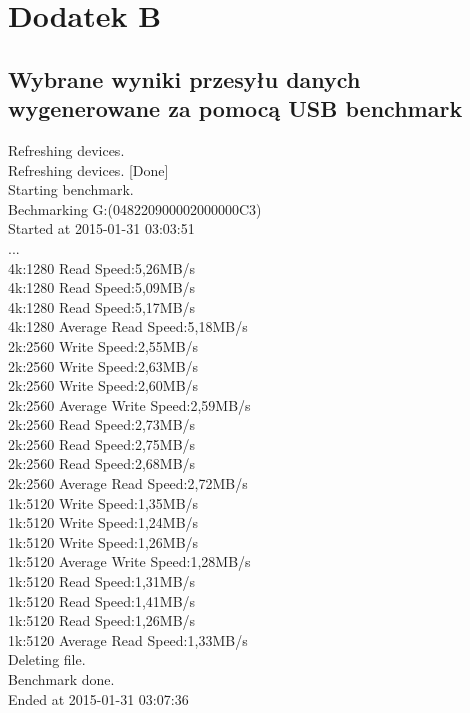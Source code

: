 \documentclass{BscUS}
\newcommand\blankpage{%
    \null
    \thispagestyle{empty}%
    \newpage}
\begin{document}
\newpage
\afterpage{\blankpage}



\chapter*{Dodatek B} \label{App:AppendixB}
\section*{Wybrane wyniki przesyłu danych wygenerowane za pomocą USB benchmark}
\noindent Refreshing devices. \\
Refreshing devices. [Done] \\ 
Starting benchmark. \\ 
Bechmarking G:(048220900002000000C3) \\
Started at 2015-01-31 03:03:51 \\
... \\
4k:1280 Read Speed:5,26MB/s\\
4k:1280 Read Speed:5,09MB/s\\
4k:1280 Read Speed:5,17MB/s\\
4k:1280 Average Read Speed:5,18MB/s\\
2k:2560 Write Speed:2,55MB/s\\
2k:2560 Write Speed:2,63MB/s\\
2k:2560 Write Speed:2,60MB/s\\
2k:2560 Average Write Speed:2,59MB/s\\
2k:2560 Read Speed:2,73MB/s\\
2k:2560 Read Speed:2,75MB/s\\
2k:2560 Read Speed:2,68MB/s\\
2k:2560 Average Read Speed:2,72MB/s\\
1k:5120 Write Speed:1,35MB/s\\
1k:5120 Write Speed:1,24MB/s\\
1k:5120 Write Speed:1,26MB/s\\
1k:5120 Average Write Speed:1,28MB/s\\
1k:5120 Read Speed:1,31MB/s\\
1k:5120 Read Speed:1,41MB/s\\
1k:5120 Read Speed:1,26MB/s\\
1k:5120 Average Read Speed:1,33MB/s\\
Deleting file.\\
Benchmark done.\\
Ended at 2015-01-31 03:07:36\\
\newpage
\afterpage{\blankpage}
\end{document}
